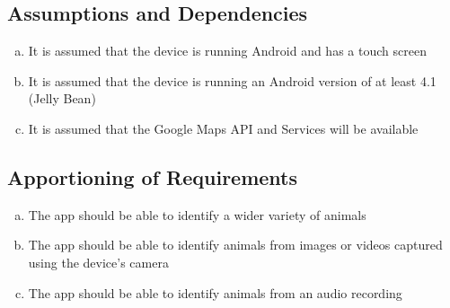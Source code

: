 \documentclass[]{article}
\begin{document}
\subsection{Assumptions and Dependencies}
\label{sub:assumptions_and_dependencies}
\begin{enumerate}[a)]
	\item It is assumed that the device is running Android and has a touch screen
	\item It is assumed that the device is running an Android version of at least 4.1 (Jelly Bean)
	\item It is assumed that the Google Maps API and Services will be available
\end{enumerate}

\subsection{Apportioning of Requirements}
\label{sub:apportioning_of_requirements}
\begin{enumerate}[a)]
    \item The app should be able to identify a wider variety of animals
	\item The app should be able to identify animals from images or videos captured using the device's camera
	\item The app should be able to identify animals from an audio recording
\end{enumerate}
\end{document}
